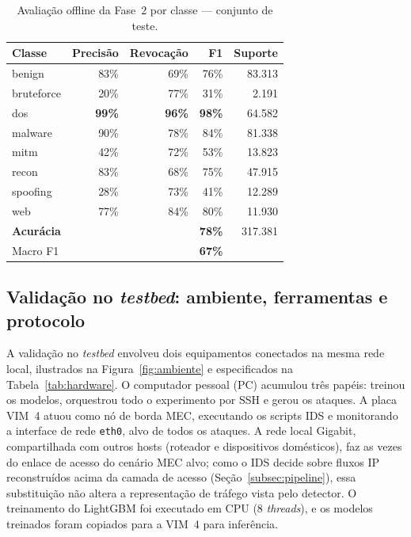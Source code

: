 \documentclass[12pt]{article}
\begin{document}
\begin{table}[ht]
\centering
\caption{Avaliação offline da Fase~2 por classe — conjunto de teste.}
\label{tab:phase2_offline}
\begin{tabular}{@{}lrrrr@{}}
\toprule
\textbf{Classe} & \textbf{Precisão} & \textbf{Revocação} & \textbf{F1} & \textbf{Suporte} \\ \midrule
benign      & 83\% & 69\% & 76\% & 83.313 \\
bruteforce  & 20\% & 77\% & 31\% &  2.191 \\
dos         & \textbf{99\%} & \textbf{96\%} & \textbf{98\%} & 64.582 \\
malware     & 90\% & 78\% & 84\% & 81.338 \\
mitm        & 42\% & 72\% & 53\% & 13.823 \\
recon       & 83\% & 68\% & 75\% & 47.915 \\
spoofing    & 28\% & 73\% & 41\% & 12.289 \\
web         & 77\% & 84\% & 80\% & 11.930 \\ \midrule
\textbf{Acurácia} & & & \textbf{78\%} & 317.381 \\
Macro F1    & & & \textbf{67\%} & \\
\bottomrule
\end{tabular}
\end{table}

\subsection{Validação no \textit{testbed}: ambiente, ferramentas e protocolo}
\label{subsec:validacao}

A validação no \textit{testbed} envolveu dois equipamentos conectados na
mesma rede local, ilustrados na Figura~\ref{fig:ambiente} e especificados
na Tabela~\ref{tab:hardware}. O computador pessoal (PC) acumulou três papéis:
treinou os modelos, orquestrou todo o experimento por SSH e gerou os ataques. A
placa VIM~4 atuou como nó de borda MEC, executando os scripts IDS e monitorando a
interface de rede \texttt{eth0}, alvo de todos os ataques. A rede local Gigabit, compartilhada com outros hosts
(roteador e dispositivos domésticos), faz as vezes do enlace de acesso do cenário MEC alvo; como o IDS decide
sobre fluxos IP reconstruídos acima da camada de acesso
(Seção~\ref{subsec:pipeline}), essa substituição não altera a representação de
tráfego vista pelo detector. O treinamento do LightGBM
foi executado em CPU (8 \textit{threads}), e os modelos treinados foram copiados para
a VIM~4 para inferência.
\end{document}
